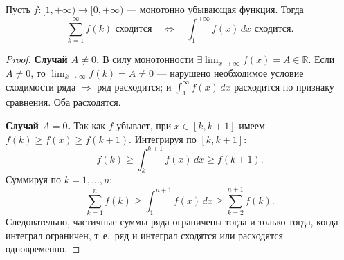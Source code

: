 \begin{theorem}
  Пусть $f: [1, +\infty) \to [0, +\infty)$ --- монотонно убывающая функция. Тогда
  \[
    \sum_{k=1}^{\infty} f(k) \text{ сходится} \quad\Longleftrightarrow\quad
    \int_1^{+\infty} f(x)\,dx \text{ сходится}.
  \]
  \begin{proof}
    \textbf{Случай $A \neq 0$.}
    В силу монотонности $\exists\lim_{x\to\infty} f(x) = A \in \mathbb{R}$.
    Если $A \neq 0$, то $\lim_{k\to\infty} f(k) = A \neq 0$ --- нарушено необходимое условие
    сходимости ряда $\Rightarrow$ ряд расходится; и $\int_1^\infty f(x)\,dx$ расходится
    по признаку сравнения. Оба расходятся.

    \textbf{Случай $A = 0$.}
    Так как $f$ убывает, при $x \in [k, k+1]$ имеем $f(k) \geq f(x) \geq f(k+1)$.
    Интегрируя по $[k, k+1]$:
    \[
      f(k) \geq \int_k^{k+1} f(x)\,dx \geq f(k+1).
    \]
    Суммируя по $k = 1, \ldots, n$:
    \[
      \sum_{k=1}^n f(k) \geq \int_1^{n+1} f(x)\,dx \geq \sum_{k=2}^{n+1} f(k).
    \]
    Следовательно, частичные суммы ряда ограничены тогда и только тогда, когда
    интеграл ограничен, т.\,е.\ ряд и интеграл сходятся или расходятся одновременно. \qedhere
  \end{proof}
\end{theorem}

